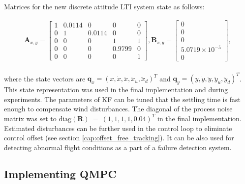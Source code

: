 Matrices for the new discrete attitude LTI system state as follows:

\begin{equation}
\begin{split}
\mathbf{A}_{x, y} = \begin{bmatrix}
1 & 0.0114 & 0 & 0 & 0 \\
0 & 1 & 0.0114 & 0 & 0\\
0 & 0 & 0 & 1 & 1 \\
0 & 0 & 0 & 0.9799 & 0 \\
0 & 0 & 0 & 0 & 1
\end{bmatrix}, \mathbf{B}_{x, y} = \begin{bmatrix}
0\\
0\\
0\\
5.0719 \times 10^{-5}\\
0
\end{bmatrix},
\end{split}
\label{eq:attitude_LTI_big_identified}
\end{equation}
\\
where the state vectors are $\mathbf{q}_{x} = \left(x, \dot{x}, \ddot{x}, \ddot{x}_u, \ddot{x}_d\right)^T$ and $\mathbf{q}_{y} = \left(y, \dot{y}, \ddot{y}, \ddot{y}_u, \ddot{y}_d\right)^T$. This state representation was used in the final implementation and during experiments. The parameters of KF can be tuned that the settling time is fast enough to compensate wind disturbances. The diagonal of the process noise matrix was set to $\mathrm{diag}(\textbf{R})~=~\left(1, 1, 1, 1, 0.04\right)^T$ in the final implementation. Estimated disturbances can be further used in the control loop to eliminate control offset (see section \ref{cap:offset_free_tracking}). It can be also used for detecting abnormal flight conditions as a part of a failure detection system.
 
\subsection{Implementing QMPC}
\label{cap:implementing_qmpc}


